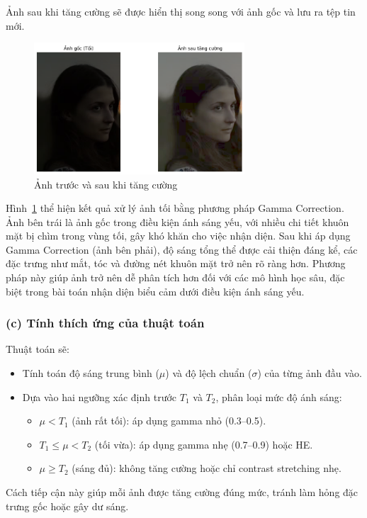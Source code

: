 Ảnh sau khi tăng cường sẽ được hiển thị song song với ảnh gốc và lưu ra tệp tin mới.


 \begin{figure}[H]
    \centering
    \includegraphics[width=0.7\textwidth]{img/anhsautangcuong.png} %
    \caption{Ảnh trước và sau khi tăng cường}
    \label{fig:emotion_distribution22}
\end{figure}

Hình~\ref{fig:emotion_distribution22} thể hiện kết quả xử lý ảnh tối bằng phương pháp Gamma Correction. Ảnh bên trái là ảnh gốc trong điều kiện ánh sáng yếu, với nhiều chi tiết khuôn mặt bị chìm trong vùng tối, gây khó khăn cho việc nhận diện. Sau khi áp dụng Gamma Correction (ảnh bên phải), độ sáng tổng thể được cải thiện đáng kể, các đặc trưng như mắt, tóc và đường nét khuôn mặt trở nên rõ ràng hơn. Phương pháp này giúp ảnh trở nên dễ phân tích hơn đối với các mô hình học sâu, đặc biệt trong bài toán nhận diện biểu cảm dưới điều kiện ánh sáng yếu.


\subsubsection*{(c) Tính thích ứng của thuật toán}
Thuật toán sẽ:
\begin{itemize}[]
    \item Tính toán độ sáng trung bình ($\mu$) và độ lệch chuẩn ($\sigma$) của từng ảnh đầu vào.
    \item Dựa vào hai ngưỡng xác định trước $T_1$ và $T_2$, phân loại mức độ ánh sáng:
    \begin{itemize}[]
        \item $\mu < T_1$ (ảnh rất tối): áp dụng gamma nhỏ (0.3--0.5).
        \item $T_1 \le \mu < T_2$ (tối vừa): áp dụng gamma nhẹ (0.7--0.9) hoặc HE.
        \item $\mu \ge T_2$ (sáng đủ): không tăng cường hoặc chỉ contrast stretching nhẹ.
    \end{itemize}
\end{itemize}
Cách tiếp cận này giúp mỗi ảnh được tăng cường đúng mức, tránh làm hỏng đặc trưng gốc hoặc gây dư sáng.

